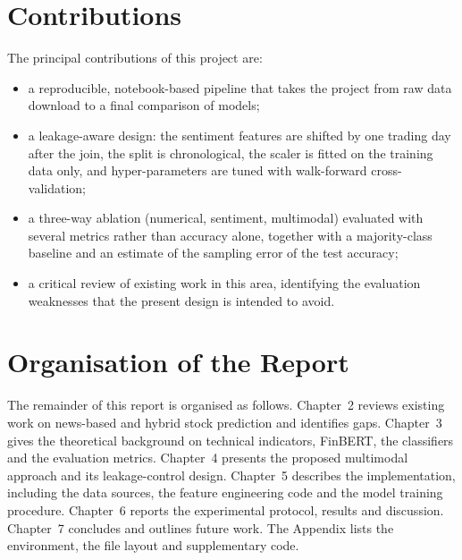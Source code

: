 \section{Contributions}
The principal contributions of this project are:
\begin{itemize}
  \item a reproducible, notebook-based pipeline that takes the project from raw data download to a final comparison of models;
  \item a leakage-aware design: the sentiment features are shifted by one trading day after the join, the split is chronological, the scaler is fitted on the training data only, and hyper-parameters are tuned with walk-forward cross-validation;
  \item a three-way ablation (numerical, sentiment, multimodal) evaluated with several metrics rather than accuracy alone, together with a majority-class baseline and an estimate of the sampling error of the test accuracy;
  \item a critical review of existing work in this area, identifying the evaluation weaknesses that the present design is intended to avoid.
\end{itemize}

\section{Organisation of the Report}
The remainder of this report is organised as follows. Chapter~2 reviews existing work on news-based and hybrid stock prediction and identifies gaps. Chapter~3 gives the theoretical background on technical indicators, FinBERT, the classifiers and the evaluation metrics. Chapter~4 presents the proposed multimodal approach and its leakage-control design. Chapter~5 describes the implementation, including the data sources, the feature engineering code and the model training procedure. Chapter~6 reports the experimental protocol, results and discussion. Chapter~7 concludes and outlines future work. The Appendix lists the environment, the file layout and supplementary code.

